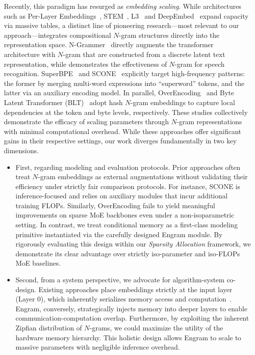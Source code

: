 Recently, this paradigm has resurged as \textit{embedding scaling}. While architectures such as Per-Layer Embeddings~\citep{gemma_3n_2025}, STEM~\citep{sadhukhan2026stem}, L3~\citep{tseng20263} and DeepEmbed~\citep{rwkv_deepembed_wiki_2025} expand capacity via massive tables, a distinct line of pioneering research—most relevant to our approach—integrates compositional $N$-gram structures directly into the representation space. 
N-Grammer~\citep{roy2022n} directly augments the transformer architecture with $N$-gram that are constructed from a discrete latent text representation, while \citet{feng2023memory} demonstrates the effectiveness of $N$-gram for speech recognition.
SuperBPE~\citep{liu2025superbpe} and SCONE~\citep{yu2025scaling} explicitly target high-frequency patterns: the former by merging multi-word expressions into ``superword'' tokens, and the latter via an auxiliary encoding model. 
In parallel, OverEncoding~\citep{huang2025over} and Byte Latent Transformer (BLT)~\citep{pagnoni2025byte} adopt hash $N$-gram embeddings to capture local dependencies at the token and byte levels, respectively. These studies collectively demonstrate the efficacy of scaling parameters through $N$-gram representations with minimal computational overhead. While these approaches offer significant gains in their respective settings, our work diverges fundamentally in two key dimensions. 
\begin{itemize}
    \item First, regarding modeling and evaluation protocols. Prior approaches often treat $N$-gram embeddings as external augmentations without validating their efficiency under strictly fair comparison protocols. For instance, SCONE \citep{yu2025scaling} is inference-focused and relies on auxiliary modules that incur additional training FLOPs. Similarly, OverEncoding \citep{huang2025over} fails to yield meaningful improvements on sparse MoE backbones even under a non-isoparametric setting. In contrast, we treat conditional memory as a first-class modeling primitive instantiated via the carefully designed Engram module. By rigorously evaluating this design within our \textit{Sparsity Allocation} framework, we demonstrate its clear advantage over strictly iso-parameter and iso-FLOPs MoE baselines.
    \item  Second, from a system perspective, we advocate for algorithm-system co-design. Existing approaches place embeddings strictly at the input layer (Layer 0), which inherently serializes memory access and computation~\citep{yu2025scaling,huang2025over}. Engram, conversely, strategically injects memory into deeper layers to enable communication-computation overlap. Furthermore, by exploiting the inherent Zipfian distribution of $N$-grams, we could maximize the utility of the hardware memory hierarchy. This holistic design allows Engram to scale to massive parameters with negligible inference overhead.
\end{itemize}


